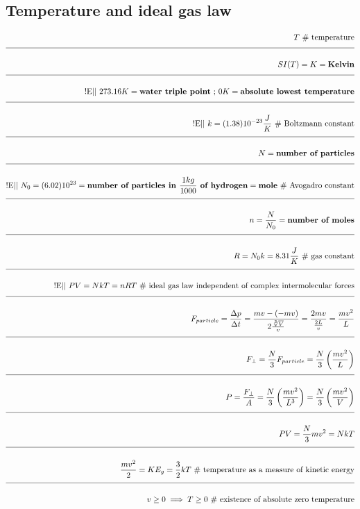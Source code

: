 \documentclass[a4paper]{article}
\newcommand{\eqComment}[1]{\text{  \# #1}}
\newcommand{\eqSep}{\text{ ;  }}
\newcommand{\experimental}{\text{!E||  }}
\newcommand{\n}{\\[1.5ex] \hline \nonumber \\[0ex]}
\begin{document}
\subsection{Temperature and ideal gas law}
\begin{tcolorbox}
\begin{align}
   T \eqComment{temperature}
\n SI(T) = K = \textbf{Kelvin}
\n \experimental 273.16 K = \textbf{water triple point} \eqSep 0 K = \textbf{absolute lowest temperature}
\n \experimental k = (1.38) 10^{-23} \frac{J}{K} \eqComment{Boltzmann constant}
\n N = \textbf{number of particles}
\n \experimental N_0 = (6.02) 10^{23} = \textbf{number of particles in $\frac{1 kg}{1000}$ of hydrogen} = \textbf{mole} \eqComment{Avogadro constant}
\n n = \frac{N}{N_0} = \textbf{number of moles}
\n R = N_0 k = 8.31 \frac{J}{K} \eqComment{gas constant}
\n \experimental P V = N k T = n R T \eqComment{ideal gas law independent of complex intermolecular forces}
\n F_{particle} = \frac{\Delta p}{\Delta t} = \frac{m v - (-m v)}{2 \frac{\sqrt[3]{V}}{v}} = \frac{2 m v}{\frac{2 L}{v}} = \frac{m v^2}{L}
\n F_\perp = \frac{N}{3} F_{particle} = \frac{N}{3} \left(\frac{m v^2}{L}\right)
\n P = \frac{F_\perp}{A} = \frac{N}{3} \left(\frac{m v^2}{L^3}\right) = \frac{N}{3} \left(\frac{m v^2}{V}\right)
\n P V = \frac{N}{3} m v^2 = N k T
\n \frac{m v^2}{2} = KE_g = \frac{3}{2} k T \eqComment{temperature as a measure of kinetic energy}
\n v \geq 0 \implies T \geq 0 \eqComment{existence of absolute zero temperature}
\end{align}
\end{tcolorbox}
\end{document}
